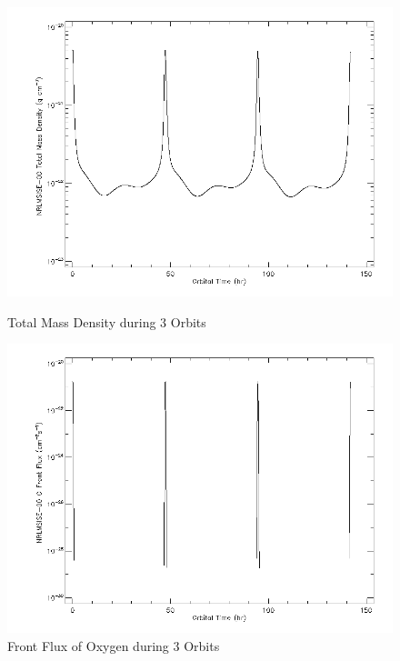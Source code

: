 %

\begin{figure}[!htbp]
  \centering
  \begin{minipage}[b]{0.45\textwidth}
	\includegraphics[width=\textwidth]{spenvis/atomox_total_mass_density}
		\caption{Total Mass Density during 3 Orbits}
	\label{fig:atmox_drag}
  \end{minipage}
  \hfill
  \begin{minipage}[b]{0.45\textwidth}
	\includegraphics[width=\textwidth]{spenvis/atomox_time}
		\caption{Front Flux of Oxygen during 3 Orbits}
	\label{fig:atmox}

  \end{minipage}
\end{figure}




